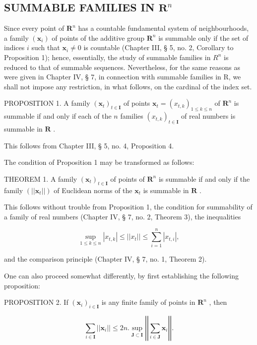 \subsection{\texorpdfstring{SUMMABLE FAMILIES IN \(\mathbf{R}^n\)}{SUMMABLE FAMILIES IN R TO THE N}}

Since every point of \(\mathbf{R}^n\) has a countable fundamental system of neighbourhoods, a family \((\pmb{x}_i)\) of points of the additive group \(\mathbf{R}^n\) is summable only if the set of indices \(i\) such that \(\mathbf{x}_i \neq 0\) is countable (Chapter III, § 5, no. 2, Corollary to Proposition 1); hence, essentially, the study of summable families in \(R^{n}\) is reduced to that of summable sequences. Nevertheless, for the same reasons as were given in Chapter IV, § 7, in connection with summable families in R, we shall not impose any restriction, in what follows, on the cardinal of the index set.

PROPOSITION 1. A family \((\pmb{x}_t)_{t\in \mathbf{I}}\) of points \(\pmb{x}_t = (x_{t,k})_{1\leq k\leq n}\) of \(\mathbf{R}^n\) is summable if and only if each of the \(n\) families \((x_{t,k})_{t\in \mathbf{I}}\) of real numbers is summable in \(\mathbf{R}\) .

This follows from Chapter III, § 5, no. 4, Proposition 4.

The condition of Proposition 1 may be transformed as follows:

THEOREM 1. A family \((\pmb{x}_t)_{t\in \mathbf{I}}\) of points of \(\mathbf{R}^n\) is summable if and only if the family \((||\pmb{x}_t||)\) of Euclidean norms of the \(\pmb{x}_t\) is summable in \(\mathbf{R}\) .

This follows without trouble from Proposition 1, the condition for summability of a family of real numbers (Chapter IV, § 7, no. 2, Theorem 3), the inequalities

\[
\sup _ {1 \leqslant k \leqslant n} | x _ {t, k} | \leqslant | | x _ {t} | | \leqslant \sum_ {i = 1} ^ {n} | x _ {t, i} |,
\]

and the comparison principle (Chapter IV, § 7, no. 1, Theorem 2).

One can also proceed somewhat differently, by first establishing the following proposition:

PROPOSITION 2. If \((\pmb{x}_i)_{i\in \mathbf{I}}\) is any finite family of points in \(\mathbf{R}^n\) , then

\[
\sum_ {i \in \mathbf {I}} | | \boldsymbol {x} _ {i} | | \leqslant 2 n. \sup _ {\mathbf {J} \subset \mathbf {I}} \left| \left| \sum_ {i \in \mathbf {J}} \boldsymbol {x} _ {i} \right| \right|.\tag{1}
\]

